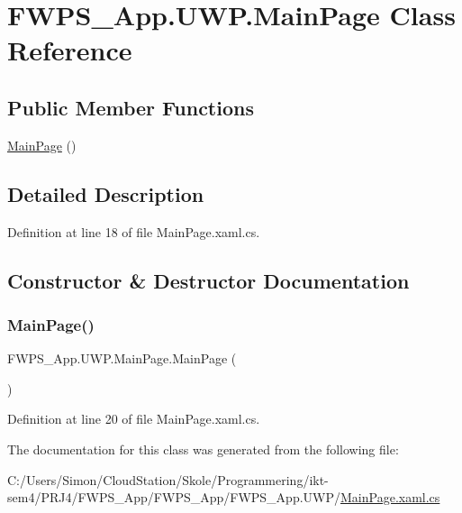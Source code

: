\hypertarget{class_f_w_p_s___app_1_1_u_w_p_1_1_main_page}{}\section{F\+W\+P\+S\+\_\+\+App.\+U\+W\+P.\+Main\+Page Class Reference}
\label{class_f_w_p_s___app_1_1_u_w_p_1_1_main_page}
\subsection*{Public Member Functions}
\begin{DoxyCompactItemize}
\item 
\mbox{\hyperlink{class_f_w_p_s___app_1_1_u_w_p_1_1_main_page_a53ffdeeda59efff0a0ea081d601b9c15}{Main\+Page}} ()
\end{DoxyCompactItemize}


\subsection{Detailed Description}


Definition at line 18 of file Main\+Page.\+xaml.\+cs.



\subsection{Constructor \& Destructor Documentation}
\mbox{\label{class_f_w_p_s___app_1_1_u_w_p_1_1_main_page_a53ffdeeda59efff0a0ea081d601b9c15}} 
\subsubsection{\texorpdfstring{Main\+Page()}{MainPage()}}
{\footnotesize\ttfamily F\+W\+P\+S\+\_\+\+App.\+U\+W\+P.\+Main\+Page.\+Main\+Page (\begin{DoxyParamCaption}{ }\end{DoxyParamCaption})}



Definition at line 20 of file Main\+Page.\+xaml.\+cs.



The documentation for this class was generated from the following file\+:\begin{DoxyCompactItemize}
\item 
C\+:/\+Users/\+Simon/\+Cloud\+Station/\+Skole/\+Programmering/ikt-\/sem4/\+P\+R\+J4/\+F\+W\+P\+S\+\_\+\+App/\+F\+W\+P\+S\+\_\+\+App/\+F\+W\+P\+S\+\_\+\+App.\+U\+W\+P/\mbox{\hyperlink{_u_w_p_2_main_page_8xaml_8cs}{Main\+Page.\+xaml.\+cs}}\end{DoxyCompactItemize}
